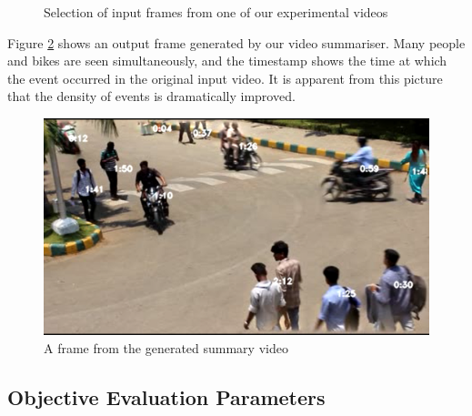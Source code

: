 \documentclass[conference]{IEEEtran}
\begin{document}
\begin{figure}[!htb]
    \endminipage
    \caption{Selection of input frames from one of our experimental videos}
    \label{img:sample-input}
\end{figure}

Figure \ref{img:sample-output} shows an output frame generated by our video
summariser. Many people and bikes are seen simultaneously, and the timestamp
shows the time at which the event occurred in the original input video. It is
apparent from this picture that the density of events is dramatically
improved.

\begin{figure}[H]
    \centering
    \includegraphics[scale=0.18]{sample-output.png}
    \caption{A frame from the generated summary video}
    \label{img:sample-output}
\end{figure}

\subsection{Objective Evaluation Parameters}
\end{document}

